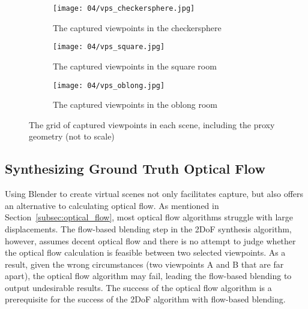 \begin{figure}
\centering
    \hfill
    \begin{subfigure}[b]{0.4\textwidth}
            \centering
            \texttt{[image: 04/vps\_checkersphere.jpg]}
            \caption{The captured viewpoints in the checkersphere}
    \end{subfigure}
    \hfill
    \begin{subfigure}[b]{0.4\textwidth}
            \centering
            \texttt{[image: 04/vps\_square.jpg]}
            \caption{The captured viewpoints in the square room}
    \end{subfigure}
    \hfill
    \hfill

    \hfill
    \begin{subfigure}[b]{0.4\textwidth}
            \centering
            \texttt{[image: 04/vps\_oblong.jpg]}
            \caption{The captured viewpoints in the oblong room}
    \end{subfigure}
    \hfill
  \caption[The grid of captured viewpoints in each scene, including the proxy geometry]{The grid of captured viewpoints in each scene, including the proxy geometry (not to scale)} \label{fig:vps_grid}
\end{figure}


\subsection{Synthesizing Ground Truth Optical Flow} \label{subsec:gt_of}
Using Blender to create virtual scenes not only facilitates capture, but also offers an alternative to calculating optical flow. As mentioned in Section~\ref{subsec:optical_flow}, most optical flow algorithms struggle with large displacements. The flow-based blending step in the 2DoF synthesis algorithm, however, assumes decent optical flow and there is no attempt to judge whether the optical flow calculation is feasible between two selected viewpoints. As a result, given the wrong circumstances (two viewpoints A and B that are far apart), the optical flow algorithm may fail, leading the flow-based blending to output undesirable results. The success of the optical flow algorithm is a prerequisite for the success of the 2DoF algorithm with flow-based blending.

